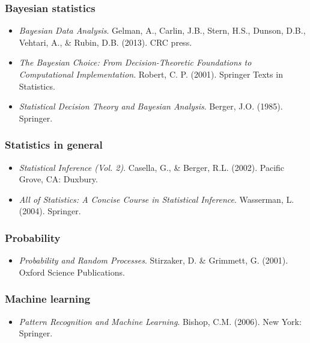 \documentclass[12pt]{article}
\begin{document}
\subsubsection*{Bayesian statistics}
\begin{itemize}
\item[] \textit{Bayesian Data Analysis}. Gelman, A., Carlin, J.B., Stern, H.S., Dunson, D.B., Vehtari, A., \& Rubin, D.B. (2013). CRC press.
\item[] \textit{The Bayesian Choice: From Decision-Theoretic Foundations to Computational Implementation}. Robert, C. P. (2001). Springer Texts in Statistics.
\item[] \textit{Statistical Decision Theory and Bayesian Analysis}. Berger, J.O. (1985). Springer.
\end{itemize}

\subsubsection*{Statistics in general}
\begin{itemize}
\item[] \textit{Statistical Inference (Vol. 2)}. Casella, G., \& Berger, R.L. (2002). Pacific Grove, CA: Duxbury.
\item[] \textit{All of Statistics: A Concise Course in Statistical Inference}. Wasserman, L. (2004). Springer.
\end{itemize}

\subsubsection*{Probability}
\begin{itemize}
\item[] \textit{Probability and Random Processes}. Stirzaker, D. \& Grimmett, G. (2001). Oxford Science Publications.
\end{itemize}

\subsubsection*{Machine learning}
\begin{itemize}
\item[] \textit{Pattern Recognition and Machine Learning}. Bishop, C.M. (2006). New York: Springer.
\end{itemize}

\fi
\end{document}
